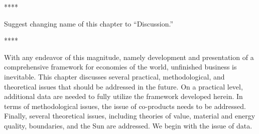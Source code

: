 
****

Suggest changing name of this chapter to ``Discussion.''

****

With any endeavor of this magnitude, 
namely development and presentation 
of a comprehensive framework for economies of the world,
unfinished business is inevitable. 
This chapter discusses several 
practical, methodological, and theoretical issues
that should be addressed in the future.
On a practical level, additional data are needed 
to fully utilize the framework developed herein.
In terms of methodological issues, the issue of co-products 
needs to be addressed.  
Finally, several theoretical issues, including
theories of value,
material and energy quality, 
boundaries, and 
the Sun
are addressed.
We begin with the issue of data.




